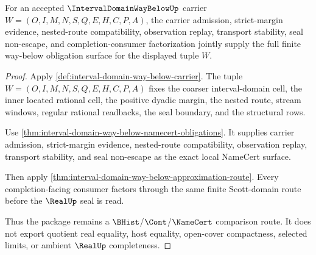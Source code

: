 \begin{theorem}
\label{thm:interval-domain-way-below-obligation-closure-package}
For an accepted $\IntervalDomainWayBelowUp$ carrier
$W=(O,I,M,N,S,Q,E,H,C,P,A)$, the carrier admission, strict-margin evidence,
nested-route compatibility, observation replay, transport stability, seal
non-escape, and completion-consumer factorization jointly supply the full
finite way-below obligation surface for the displayed tuple $W$.
\end{theorem}
\begin{proof}
Apply \autoref{def:interval-domain-way-below-carrier}. The tuple
$W=(O,I,M,N,S,Q,E,H,C,P,A)$ fixes the coarser interval-domain cell, the inner
located rational cell, the positive dyadic margin, the nested route, stream
windows, regular rational readbacks, the seal boundary, and the structural
rows.

Use
\autoref{thm:interval-domain-way-below-namecert-obligations}. It supplies
carrier admission, strict-margin evidence, nested-route compatibility,
observation replay, transport stability, and seal non-escape as the exact
local NameCert surface.

Then apply
\autoref{thm:interval-domain-way-below-approximation-route}. Every
completion-facing consumer factors through the same finite Scott-domain
route before the $\RealUp$ seal is read.

Thus the package remains a $\BHist$/$\Cont$/$\NameCert$ comparison route. It
does not export quotient real equality, host equality, open-cover compactness,
selected limits, or ambient $\RealUp$ completeness.
\end{proof}

